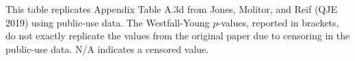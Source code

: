 \documentclass{article}
\begin{document}
\begin{table}[tbp]
{\begin{tabularx}{\linewidth}{lCCCCC}
\end{tabularx}
\begin{flushleft}
\footnotesize This table replicates Appendix Table A.3d from Jones, Molitor, and Reif (QJE 2019) using public-use data. The Westfall-Young \(p\)-values, reported in brackets, do not exactly replicate the values from the original paper due to censoring in the public-use data. N/A indicates a censored value.
\end{flushleft}
}
\end{table}
\end{document}
